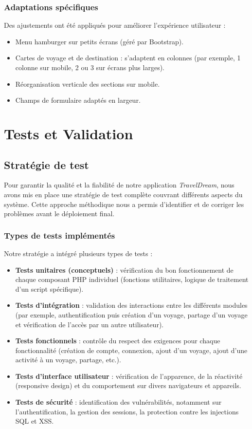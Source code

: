 \documentclass[a4paper,12pt]{article}
\begin{document}
\subsubsection{Adaptations spécifiques}
Des ajustements ont été appliqués pour améliorer l’expérience utilisateur :
\begin{itemize}
  \item Menu hamburger sur petits écrans (géré par Bootstrap).
  \item Cartes de voyage et de destination : s'adaptent en colonnes (par exemple, 1 colonne sur mobile, 2 ou 3 sur écrans plus larges).
  \item Réorganisation verticale des sections sur mobile.
  \item Champs de formulaire adaptés en largeur.
\end{itemize}

\section{Tests et Validation}

\subsection{Stratégie de test}
Pour garantir la qualité et la fiabilité de notre application \textit{TravelDream}, nous avons mis en place une stratégie de test complète couvrant différents aspects du système. Cette approche méthodique nous a permis d'identifier et de corriger les problèmes avant le déploiement final.

\subsubsection{Types de tests implémentés}
Notre stratégie a intégré plusieurs types de tests :
\begin{itemize}
  \item \textbf{Tests unitaires (conceptuels)} : vérification du bon fonctionnement de chaque composant PHP individuel (fonctions utilitaires, logique de traitement d'un script spécifique).
  \item \textbf{Tests d'intégration} : validation des interactions entre les différents modules (par exemple, authentification puis création d'un voyage, partage d'un voyage et vérification de l'accès par un autre utilisateur).
  \item \textbf{Tests fonctionnels} : contrôle du respect des exigences pour chaque fonctionnalité (création de compte, connexion, ajout d'un voyage, ajout d'une activité à un voyage, partage, etc.).
  \item \textbf{Tests d’interface utilisateur} : vérification de l'apparence, de la réactivité (responsive design) et du comportement sur divers navigateurs et appareils.
  \item \textbf{Tests de sécurité} : identification des vulnérabilités, notamment sur l’authentification, la gestion des sessions, la protection contre les injections SQL et XSS.
\end{itemize}
\end{document}
